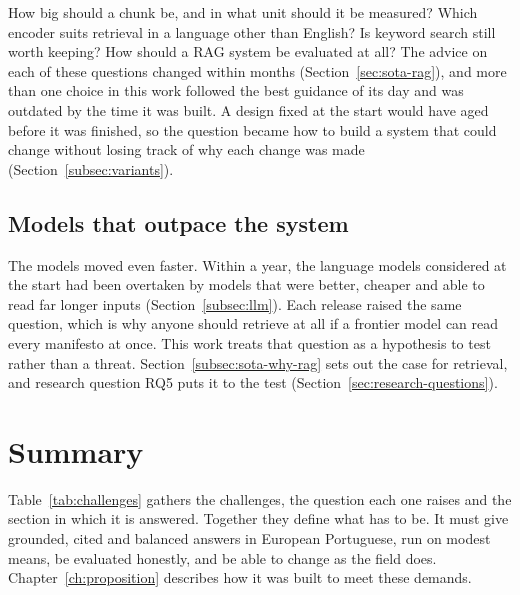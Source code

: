 How big should a chunk be, and in what unit should it be measured? Which encoder suits retrieval in a language other than English? Is keyword search still worth keeping? How should a RAG system be evaluated at all? The advice on each of these questions changed within months (Section~\ref{sec:sota-rag}), and more than one choice in this work followed the best guidance of its day and was outdated by the time it was built. A design fixed at the start would have aged before it was finished, so the question became how to build a system that could change without losing track of why each change was made (Section~\ref{subsec:variants}).

\subsection{Models that outpace the system} \label{subsec:challenge-obsolescence}

The models moved even faster. Within a year, the language models considered at the start had been overtaken by models that were better, cheaper and able to read far longer inputs (Section~\ref{subsec:llm}). Each release raised the same question, which is why anyone should retrieve at all if a frontier model can read every manifesto at once. This work treats that question as a hypothesis to test rather than a threat. Section~\ref{subsec:sota-why-rag} sets out the case for retrieval, and research question RQ5 puts it to the test (Section~\ref{sec:research-questions}).

\section{Summary} \label{sec:challenges-summary}

Table~\ref{tab:challenges} gathers the challenges, the question each one raises and the section in which it is answered. Together they define what \sysname{} has to be. It must give grounded, cited and balanced answers in European Portuguese, run on modest means, be evaluated honestly, and be able to change as the field does. Chapter~\ref{ch:proposition} describes how it was built to meet these demands.

